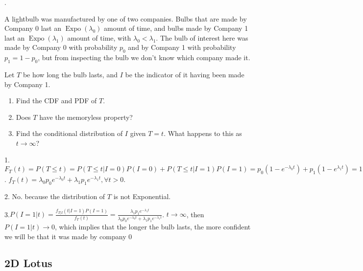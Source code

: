 \documentclass[8pt]{beamer}
\newcommand{\myexpo}[1]{\operatorname{Expo}\!\left(#1\right)}
\begin{document}
\begin{frame}{.}
    \begin{example}
      A lightbulb was manufactured by one of two companies. 
      Bulbs that are made by Company 0 last an $\myexpo{\lambda_0}$ amount of time, and bulbs made by Company 1 last an $\myexpo{\lambda_1}$ amount of time, with $\lambda_0 < \lambda_1$. 
      The bulb of interest here was made by Company 0 with probability $p_0$ and by Company 1 with probability $p_1 = 1 - p_0$, but from inspecting the bulb we don't know which company made it.

      Let $T$ be how long the bulb lasts, and $I$ be the indicator of it having been made by Company 1.
      \begin{enumerate}
        \item Find the CDF and PDF of $T$.
        \item Does $T$ have the memoryless property?
        \item Find the conditional distribution of $I$ given $T=t$. What happens to this as $t \rightarrow \infty$?
      \end{enumerate}
    \end{example}
    1. $F_{T}(t) = P(T\leq t) = P(T\leq t|I=0)P(I=0) + P(T\leq t|I=1)P(I=1) = p_0 (1 - e^{-\lambda_0 t} )   + p_1 ( 1- e^{\lambda_1 t} ) = 1 - p_0 e^{-\lambda_0 t} - p_1 e^{-\lambda_1 t}, \forall t>0$. 
    $f_T(t) = \lambda_0 p_0 e^{-\lambda_0 t} + \lambda_1 p_1 e^{-\lambda_1 t}, \forall t>0$.

    2. No. because the distribution of $T$ is not Exponential.

    3.$P(I=1|t) = \frac{f_{T|I}(t|I=1) P(I=1)}{f_T(t)} = \frac{\lambda_1 p_1 e^{-\lambda_1 t}}{\lambda_0 p_0 e^{-\lambda_0 t} + \lambda_1 p_1 e^{-\lambda_1 t}}$. $t\rightarrow \infty$, then $P(I=1|t) \rightarrow 0$, which implies that the longer the bulb lasts, the more confident we will be that it was made by company 0
\end{frame}

\subsection{2D Lotus}
\end{document}
